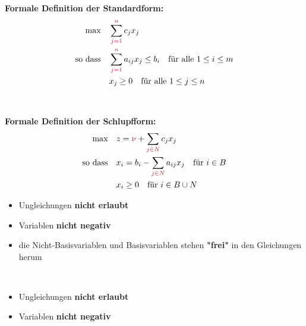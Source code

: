 \documentclass{article}
\begin{document}
\newpage
\begin{vsbox}[title=Standardform vs. Schlupfform]  
\begin{minipage}{8cm} 
\textbf{Formale Definition der Standardform: }
\begin{align*}
    \text{max} \quad & \sum_{\textcolor{Maroon}{j=1}}^{\textcolor{Maroon}{n}} c_j x_j \\
    \text{so dass} \quad & \sum_{\textcolor{Maroon}{j=1}}^{\textcolor{Maroon}{n}} a_{ij} x_j \leq b_i \quad \text{für alle } 1 \leq i \leq m \\
    & x_j \geq 0 \quad \text{für alle } 1 \leq j \leq n \\
\end{align*}
\end{minipage}
\begin{minipage}{0.5cm}
$\ $
\end{minipage}
\begin{minipage}{8cm}
\textbf{Formale Definition der Schlupfform:}
\begin{align*}
    \text{max} \quad & z = \textcolor{Maroon}{\nu} + \sum_{\textcolor{Maroon}{j \in N}} c_j x_j \\
    \text{so dass} \quad & x_i = b_i - \sum_{\textcolor{Maroon}{j \in N}} a_{ij} x_j \quad \text{für } i \in B\\
    & x_i \geq 0 \quad \text{für } i \in B \cup N \\
\end{align*}
\end{minipage}
\begin{minipage}{8cm}
\begin{itemize}
    \item Ungleichungen \textbf{nicht erlaubt}
    \item Variablen \textbf{nicht negativ} 
    \item die Nicht-Basisvariablen und Basisvariablen stehen \textbf{"frei"} in den Gleichungen herum
\end{itemize}
\end{minipage}
\begin{minipage}{0.5cm}
$\ $
\end{minipage}
\begin{minipage}{8cm}
\begin{itemize}
    \item Ungleichungen \textbf{nicht erlaubt}
    \item Variablen \textbf{nicht negativ} 

\end{itemize}
\end{minipage}
\end{vsbox}
\end{document}
